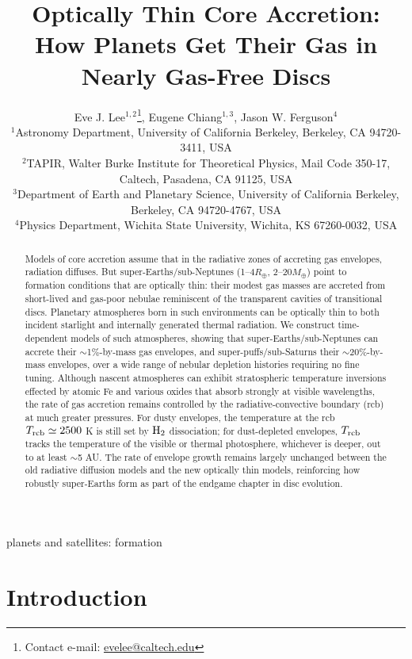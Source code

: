 \documentclass[fleqn,useAMS,usenatbib]{mnras}
\title[Optically Thin Core Accretion]{Optically Thin Core Accretion: \\How Planets Get Their Gas in Nearly Gas-Free Discs}
\author[Lee, Chiang, \& Ferguson]{Eve J. Lee$^{1,2}$\thanks{Contact e-mail: \href{mailto:evelee@caltech.edu}{evelee@caltech.edu}}, Eugene Chiang$^{1,3}$, Jason W. Ferguson$^{4}$\\
$^{1}$Astronomy Department, University of California Berkeley, Berkeley, CA 94720-3411, USA\\
$^{2}$TAPIR, Walter Burke Institute for Theoretical Physics, Mail Code 350-17, Caltech, Pasadena, CA 91125, USA\\
$^{3}$Department of Earth and Planetary Science, University of California Berkeley, Berkeley, CA 94720-4767, USA\\
$^{4}$Physics Department, Wichita State University, Wichita, KS 67260-0032, USA
}
\date{}
\begin{document}
\maketitle
\label{firstpage}

\begin{abstract}
Models of core accretion assume that in the radiative zones
of accreting gas envelopes, radiation diffuses.
But super-Earths/sub-Neptunes (1--4$R_\oplus$, 2--20$M_\oplus$)
point to formation conditions that are optically thin:
their modest gas masses are accreted from 
short-lived and gas-poor nebulae reminiscent of
the transparent cavities of transitional discs.
Planetary atmospheres born in such environments can be optically thin
to both incident starlight and internally generated
thermal radiation.
We construct time-dependent models of such atmospheres, 
showing that super-Earths/sub-Neptunes can accrete their $\sim$1\%-by-mass gas
envelopes, and super-puffs/sub-Saturns their $\sim$20\%-by-mass
envelopes, over a wide range of nebular depletion histories
requiring no fine tuning.
Although nascent atmospheres can exhibit stratospheric temperature inversions
effected by atomic Fe and various oxides that absorb strongly
at visible wavelengths, the rate of gas accretion remains controlled by the
radiative-convective boundary (rcb) at much greater pressures.
For dusty envelopes, the temperature at the rcb
$T_{\rm rcb} \simeq 2500$ K is still set by 
${\rm H}_2$ dissociation; for dust-depleted envelopes, $T_{\rm rcb}$
tracks the temperature of the visible or thermal photosphere,
whichever is deeper, out to at least $\sim$5 AU.
The rate of envelope growth remains largely unchanged between the old
radiative diffusion models and the new optically thin models, 
reinforcing how 
robustly super-Earths form as part of the endgame chapter in disc evolution.
\end{abstract}

\begin{keywords}
planets and satellites: formation
\end{keywords}

\section{Introduction}
\label{sec:introduction}
\end{document}
